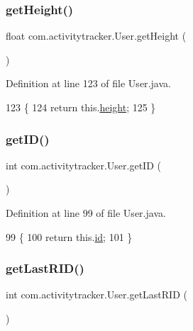 \subsubsection{\texorpdfstring{get\+Height()}{getHeight()}}
{\footnotesize\ttfamily float com.\+activitytracker.\+User.\+get\+Height (\begin{DoxyParamCaption}{ }\end{DoxyParamCaption})}



Definition at line 123 of file User.\+java.


\begin{DoxyCode}
123                              \{
124         \textcolor{keywordflow}{return} this.\mbox{\hyperlink{classcom_1_1activitytracker_1_1_user_a83cdfe6f520a4e18e8710e8e11f8c3d6}{height}};
125     \}
\end{DoxyCode}
\mbox{\label{classcom_1_1activitytracker_1_1_user_a967ae64a7818e9e532ad6d361650d8e6}} 
\subsubsection{\texorpdfstring{get\+I\+D()}{getID()}}
{\footnotesize\ttfamily int com.\+activitytracker.\+User.\+get\+ID (\begin{DoxyParamCaption}{ }\end{DoxyParamCaption})}



Definition at line 99 of file User.\+java.


\begin{DoxyCode}
99                        \{
100         \textcolor{keywordflow}{return} this.\mbox{\hyperlink{classcom_1_1activitytracker_1_1_user_adc05319380c2cbb37477ab5aab86317c}{id}};
101     \}
\end{DoxyCode}
\mbox{\label{classcom_1_1activitytracker_1_1_user_a7040d0d696d79f9592eec6ac507de3c7}} 
\subsubsection{\texorpdfstring{get\+Last\+R\+I\+D()}{getLastRID()}}
{\footnotesize\ttfamily int com.\+activitytracker.\+User.\+get\+Last\+R\+ID (\begin{DoxyParamCaption}{ }\end{DoxyParamCaption})}




